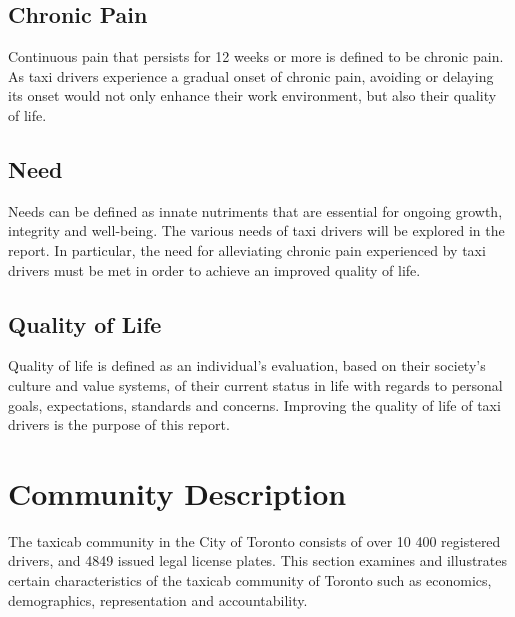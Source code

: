 \documentclass[11pt]{article}
\begin{document}
\subsection{Chronic Pain}
\label{sec:pain}

Continuous pain that persists for 12 weeks or more is defined to be
chronic pain\cite{chronic}. As taxi drivers experience a gradual onset of chronic
pain, avoiding or delaying its onset would not only enhance their work
environment, but also their quality of life.

\subsection{Need}
\label{sec:needs}
Needs can be defined as innate nutriments that are essential for 
ongoing growth, integrity and well-being\cite{deci2000and}. The 
various needs of taxi drivers will be explored in the report. In 
particular, the need for alleviating chronic pain experienced by 
taxi drivers must be met in order to achieve an improved quality 
of life. 

\subsection{Quality of Life}
\label{sec:lifequal}

Quality of life is defined as an individual's evaluation, based on
their society's culture and value systems, of their current status in
life with regards to personal goals, expectations, standards and
concerns\cite{WHO}. Improving the quality of life of taxi drivers is the
purpose of this report.

\section{Community Description}
\label{sec:community}
The taxicab community in the City of Toronto consists of over 10 400 registered drivers, 
and 4849 issued legal license plates. This section examines and 
illustrates certain characteristics of the taxicab community of Toronto such as economics, 
demographics, representation and accountability.
\end{document}
